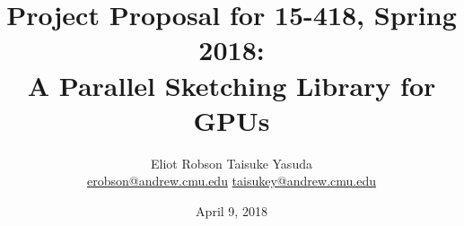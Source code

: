 \documentclass[12pt]{article}
\begin{document}
\title{
    \normalsize Project Proposal for 15-418, Spring 2018: \\
    \LARGE A Parallel Sketching Library for GPUs
}
\author{Eliot Robson \qquad Taisuke Yasuda\\ \small
\href{mailto:erobson@andrew.cmu.edu}{erobson@andrew.cmu.edu} \quad \href{mailto:taisukey@andrew.cmu.edu}{taisukey@andrew.cmu.edu}}
\date{April 9, 2018}

\maketitle
\end{document}
